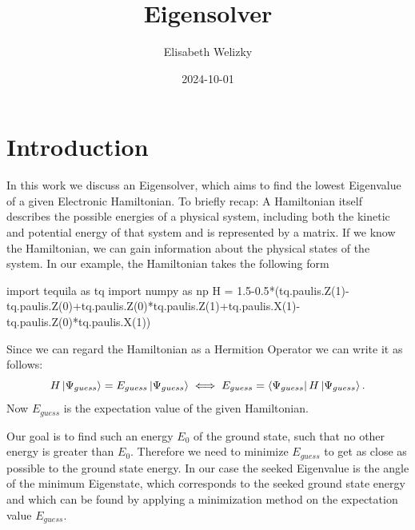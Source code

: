\documentclass[
  letterpaper,
  DIV=11,
  numbers=noendperiod]{scrartcl}
\title{Eigensolver}
\author{Elisabeth Welizky}
\date{2024-10-01}
\newenvironment{Shaded}{\begin{snugshade}}{\end{snugshade}}
\newcommand{\DecValTok}[1]{\textcolor[rgb]{0.68,0.00,0.00}{#1}}
\newcommand{\FloatTok}[1]{\textcolor[rgb]{0.68,0.00,0.00}{#1}}
\newcommand{\ImportTok}[1]{\textcolor[rgb]{0.00,0.46,0.62}{#1}}
\newcommand{\NormalTok}[1]{\textcolor[rgb]{0.00,0.23,0.31}{#1}}
\newcommand{\OperatorTok}[1]{\textcolor[rgb]{0.37,0.37,0.37}{#1}}
\renewcommand*\contentsname{Table of contents}
\newcommand\contentsname{Table of contents}
\begin{document}
\maketitle

\renewcommand*\contentsname{Table of contents}
{
\hypersetup{linkcolor=}
\setcounter{tocdepth}{3}
\tableofcontents
}
\section{Introduction}\label{introduction}

In this work we discuss an Eigensolver, which aims to find the lowest
Eigenvalue of a given Electronic Hamiltonian. To briefly recap: A
Hamiltonian itself describes the possible energies of a physical system,
including both the kinetic and potential energy of that system and is
represented by a matrix. If we know the Hamiltonian, we can gain
information about the physical states of the system. In our example, the
Hamiltonian takes the following form

\begin{Shaded}
\begin{Highlighting}[]
\ImportTok{import}\NormalTok{ tequila }\ImportTok{as}\NormalTok{ tq}
\ImportTok{import}\NormalTok{ numpy }\ImportTok{as}\NormalTok{ np}
\NormalTok{H }\OperatorTok{=} \FloatTok{1.5}\OperatorTok{{-}}\FloatTok{0.5}\OperatorTok{*}\NormalTok{(tq.paulis.Z(}\DecValTok{1}\NormalTok{)}\OperatorTok{{-}}\NormalTok{tq.paulis.Z(}\DecValTok{0}\NormalTok{)}\OperatorTok{+}\NormalTok{tq.paulis.Z(}\DecValTok{0}\NormalTok{)}\OperatorTok{*}\NormalTok{tq.paulis.Z(}\DecValTok{1}\NormalTok{)}\OperatorTok{+}\NormalTok{tq.paulis.X(}\DecValTok{1}\NormalTok{)}\OperatorTok{{-}}\NormalTok{tq.paulis.Z(}\DecValTok{0}\NormalTok{)}\OperatorTok{*}\NormalTok{tq.paulis.X(}\DecValTok{1}\NormalTok{))}
\end{Highlighting}
\end{Shaded}

Since we can regard the Hamiltonian as a Hermition Operator we can write
it as follows:\\
\[H\ket{\Psi_{guess}} =  E_{guess}\ket{\Psi_{guess}} \iff E_{guess} = \bra{\Psi_{guess}}H\ket{\Psi_{guess}}.\]
Now \(E_{guess}\) is the expectation value of the given Hamiltonian.

Our goal is to find such an energy \(E_{0}\) of the ground state, such
that no other energy is greater than \(E_{0}\). Therefore we need to
minimize \(E_{guess}\) to get as close as possible to the ground state
energy. In our case the seeked Eigenvalue is the angle of the minimum
Eigenstate, which corresponds to the seeked ground state energy and
which can be found by applying a minimization method on the expectation
value \(E_{guess}\).
\end{document}
